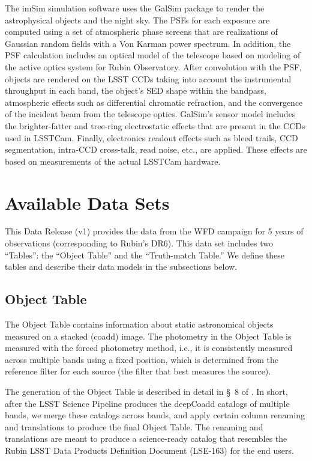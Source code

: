 \documentclass[modern]{descnote}
\begin{document}
The imSim simulation software uses the GalSim package \citep{2015A&C....10..121R} to render the astrophysical objects and the night sky.  The PSFs for each exposure are computed using a set of atmospheric phase screens that are realizations of Gaussian random fields with a Von Karman power spectrum.  In addition, the PSF calculation includes an optical model of the telescope based on modeling of the active optics system for Rubin Observatory.  After convolution with the PSF, objects are rendered on the LSST CCDs taking into account the instrumental throughput in each band, the object's SED shape within the bandpass, atmospheric effects such as differential chromatic refraction, and the convergence of the incident beam from the telescope optics. GalSim's sensor model includes the brighter-fatter and tree-ring electrostatic effects that are present in the CCDs used in LSSTCam.  Finally, electronics readout effects such as bleed trails, CCD segmentation, intra-CCD cross-talk, read noise, etc., are applied.  These effects are based on measurements of the actual LSSTCam hardware.


\section{Available Data Sets}
\label{sec:products}

This Data Release (v1) provides the data from the WFD campaign for 5 years of observations (corresponding to Rubin's DR6). This data set includes two ``Tables'': the ``Object Table'' and the ``Truth-match Table.'' We define these tables and describe their data models in the subsections below. 

\subsection{Object Table}
\label{sec:object}

The Object Table contains information about static astronomical objects measured on a stacked (coadd) image. The photometry in the Object Table is measured with the forced photometry method, i.e., it is consistently measured across multiple bands using a fixed position, which is determined from the reference filter for each source (the filter that best measures the source). 

The generation of the Object Table is described in detail in \S~8 of \cite{2020arXiv201005926L}. In short, after the LSST Science Pipeline produces the deepCoadd catalogs of multiple bands, we merge these catalogs across bands, and apply certain column renaming and translations to produce the final Object Table. The renaming and translations are meant to produce a science-ready catalog that resembles the Rubin LSST Data Products Definition Document (LSE-163) for the end users. 
\end{document}

